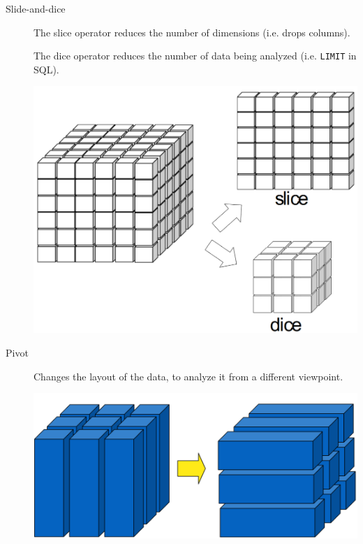 \begin{description}
    \item[Slide-and-dice] 
        \begin{minipage}{0.65\textwidth}
            The slice operator reduces the number of dimensions (i.e. drops columns).

            The dice operator reduces the number of data being analyzed (i.e. \texttt{LIMIT} in SQL).
        \end{minipage}
        \hfill
        \begin{minipage}{0.15\textwidth}
            \centering
            \includegraphics[width=\linewidth]{img/olap_slicedice.png}
        \end{minipage}    

    \item[Pivot] 
        \begin{minipage}{0.7\textwidth}
            Changes the layout of the data, to analyze it from a different viewpoint.
        \end{minipage}
        \hfill
        \begin{minipage}{0.15\textwidth}
            \centering
            \includegraphics[width=\linewidth]{img/olap_pivot.png}
        \end{minipage}


\end{description}
